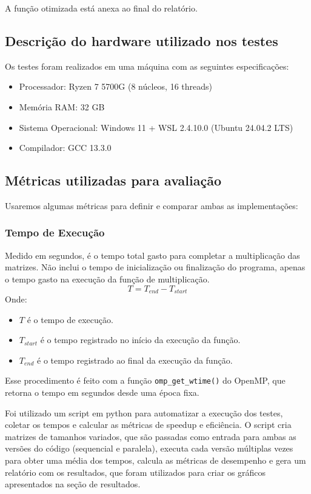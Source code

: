 \documentclass[12pt, a4paper]{article}
\begin{document}
    A função otimizada está anexa ao final do relatório.

    \subsection{Descrição do hardware utilizado nos testes}

    Os testes foram realizados em uma máquina com as seguintes especificações:
    \begin{itemize}
        \item Processador: Ryzen 7 5700G (8 núcleos, 16 threads)
        \item Memória RAM: 32 GB
        \item Sistema Operacional: Windows 11 + WSL 2.4.10.0 (Ubuntu 24.04.2 LTS)
        \item Compilador: GCC 13.3.0
    \end{itemize}

	\subsection{Métricas utilizadas para avaliação}
	Usaremos algumas métricas para definir e comparar ambas as implementações:

    \subsubsection{Tempo de Execução}

    Medido em segundos, é o tempo total gasto para completar a multiplicação das matrizes.
    Não inclui o tempo de inicialização ou finalização do programa, apenas o tempo gasto na
    execução da função de multiplicação.
    \[
        T = T_{end} - T_{start}
    \]
    Onde:
    \begin{itemize}
        \item $T$ é o tempo de execução.
        \item $T_{start}$ é o tempo registrado no início da execução da função.
        \item $T_{end}$ é o tempo registrado ao final da execução da função.
    \end{itemize}

    Esse procedimento é feito com a função \texttt{omp\_get\_wtime()} do OpenMP, 
    que retorna o tempo em segundos desde uma época fixa.

    Foi utilizado um script em python para automatizar a execução dos testes,
    coletar os tempos e calcular as métricas de speedup e eficiência. O script
    cria matrizes de tamanhos variados, que são passadas como entrada para
    ambas as versões do código (sequencial e paralela), executa cada versão
    múltiplas vezes para obter uma média dos tempos, calcula as métricas
    de desempenho e gera um relatório com os resultados, que foram utilizados
    para criar os gráficos apresentados na seção de resultados.
\end{document}
